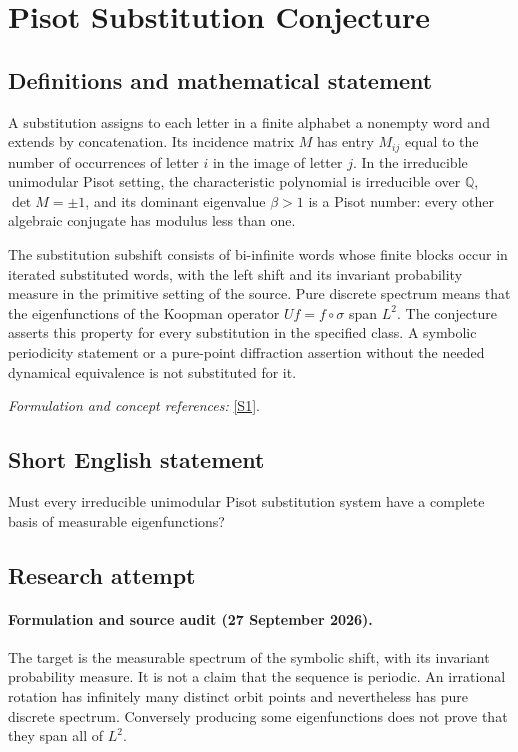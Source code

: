 \documentclass[11pt]{article}
\begin{document}
\section*{\texorpdfstring{Pisot Substitution Conjecture}{Pisot Substitution Conjecture}}\label{30006953}
\subsection{Definitions and mathematical statement}
A substitution assigns to each letter in a finite alphabet a nonempty word and extends by concatenation. Its incidence matrix $M$ has entry $M_{ij}$ equal to the number of occurrences of letter $i$ in the image of letter $j$. In the irreducible unimodular Pisot setting, the characteristic polynomial is irreducible over ${\mathbb{Q}}$, $\det M=\pm1$, and its dominant eigenvalue $\beta>1$ is a Pisot number: every other algebraic conjugate has modulus less than one.

The substitution subshift consists of bi-infinite words whose finite blocks occur in iterated substituted words, with the left shift and its invariant probability measure in the primitive setting of the source. Pure discrete spectrum means that the eigenfunctions of the Koopman operator $Uf=f\circ\sigma$ span $L^2$. The conjecture asserts this property for every substitution in the specified class. A symbolic periodicity statement or a pure-point diffraction assertion without the needed dynamical equivalence is not substituted for it.
\par\smallskip\textit{Formulation and concept references:} \href{https://ems.press/content/serial-article-files/32990?nt=1}{[S1]}.

\subsection{Short English statement}
Must every irreducible unimodular Pisot substitution system have a complete basis of measurable eigenfunctions?
\subsection{Research attempt}
\paragraph{Formulation and source audit (27 September 2026).}
The target is the measurable spectrum of the symbolic shift, with its
invariant probability measure. It is not a claim that the sequence is
periodic. An irrational rotation has infinitely many distinct orbit points
and nevertheless has pure discrete spectrum. Conversely producing some
eigenfunctions does not prove that they span all of $L^2$.
\end{document}
